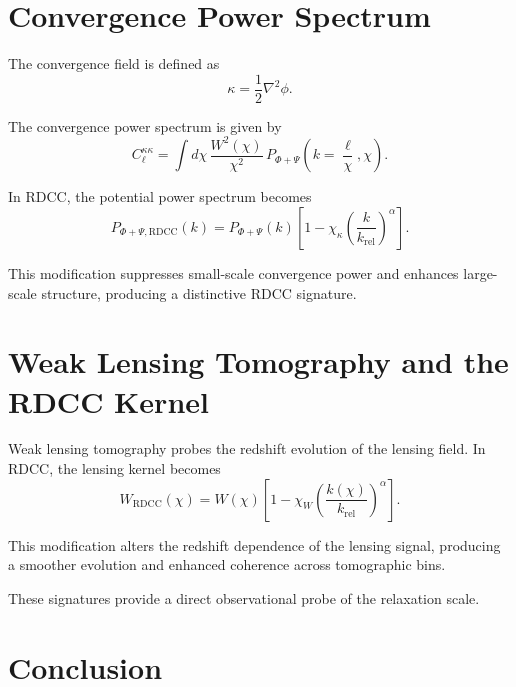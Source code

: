 \documentclass[11pt,a4paper]{article}
\begin{document}
\section{Convergence Power Spectrum}

The convergence field is defined as
\begin{equation}
    \kappa
    = \frac{1}{2}\nabla^{2}\phi.
\end{equation}

The convergence power spectrum is given by
\begin{equation}
    C_{\ell}^{\kappa\kappa}
    = \int d\chi\,
      \frac{W^{2}(\chi)}{\chi^{2}}\,
      P_{\Phi+\Psi}\left(k=\frac{\ell}{\chi},\chi\right).
\end{equation}

In RDCC, the potential power spectrum becomes
\begin{equation}
    P_{\Phi+\Psi,\mathrm{RDCC}}(k)
    = P_{\Phi+\Psi}(k)
      \left[
        1 - \chi_{\kappa}
        \left(\frac{k}{k_{\mathrm{rel}}}\right)^{\alpha}
      \right].
\end{equation}

This modification suppresses small-scale convergence power and enhances large-scale 
structure, producing a distinctive RDCC signature.
\section{Weak Lensing Tomography and the RDCC Kernel}

Weak lensing tomography probes the redshift evolution of the lensing field. In 
RDCC, the lensing kernel becomes
\begin{equation}
    W_{\mathrm{RDCC}}(\chi)
    = W(\chi)
      \left[
        1 - \chi_{W}
        \left(\frac{k(\chi)}{k_{\mathrm{rel}}}\right)^{\alpha}
      \right].
\end{equation}

This modification alters the redshift dependence of the lensing signal, producing 
a smoother evolution and enhanced coherence across tomographic bins.

These signatures provide a direct observational probe of the relaxation scale.
\section{Conclusion}
\end{document}
